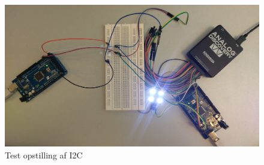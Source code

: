 \begin{figure}[H]
	\centering
	\includegraphics[width = 450pt]{Img/TestOpstilling.jpg}
	\caption{Test opstilling af I2C}
	\label{fig:I2C_Test}
\end{figure}


